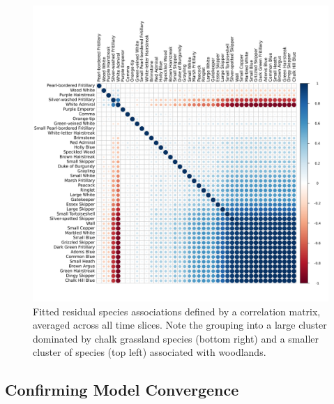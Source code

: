 \documentclass[
]{article}
\begin{document}
\begin{figure}
\centering
\includegraphics[width=\textwidth,height=0.8\textheight]{ButterflyMarkdowns/ButterflySIFigs/SpAssCoeffs.png}
\caption{Fitted residual species associations defined by a correlation
matrix, averaged across all time slices. Note the grouping into a large
cluster dominated by chalk grassland species (bottom right) and a
smaller cluster of species (top left) associated with woodlands.}
\end{figure}

\hypertarget{confirming-model-convergence}{%
\subsection{Confirming Model
Convergence}\label{confirming-model-convergence}}
\end{document}
